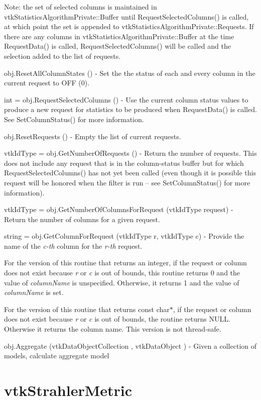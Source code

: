 \begin{DoxyItemize}
Note\-: the set of selected columns is maintained in vtk\-Statistics\-Algorithm\-Private\-::\-Buffer until Request\-Selected\-Columns() is called, at which point the set is appended to vtk\-Statistics\-Algorithm\-Private\-::\-Requests. If there are any columns in vtk\-Statistics\-Algorithm\-Private\-::\-Buffer at the time Request\-Data() is called, Request\-Selected\-Columns() will be called and the selection added to the list of requests.  
\item {\ttfamily obj.\-Reset\-All\-Column\-States ()} -\/ Set the the status of each and every column in the current request to O\-F\-F (0).  
\item {\ttfamily int = obj.\-Request\-Selected\-Columns ()} -\/ Use the current column status values to produce a new request for statistics to be produced when Request\-Data() is called. See Set\-Column\-Status() for more information.  
\item {\ttfamily obj.\-Reset\-Requests ()} -\/ Empty the list of current requests.  
\item {\ttfamily vtk\-Id\-Type = obj.\-Get\-Number\-Of\-Requests ()} -\/ Return the number of requests. This does not include any request that is in the column-\/status buffer but for which Request\-Selected\-Columns() has not yet been called (even though it is possible this request will be honored when the filter is run -- see Set\-Column\-Status() for more information).  
\item {\ttfamily vtk\-Id\-Type = obj.\-Get\-Number\-Of\-Columns\-For\-Request (vtk\-Id\-Type request)} -\/ Return the number of columns for a given request.  
\item {\ttfamily string = obj.\-Get\-Column\-For\-Request (vtk\-Id\-Type r, vtk\-Id\-Type c)} -\/ Provide the name of the {\itshape c-\/th} column for the {\itshape r-\/th} request.

For the version of this routine that returns an integer, if the request or column does not exist because {\itshape r} or {\itshape c} is out of bounds, this routine returns 0 and the value of {\itshape column\-Name} is unspecified. Otherwise, it returns 1 and the value of {\itshape column\-Name} is set.

For the version of this routine that returns const char$\ast$, if the request or column does not exist because {\itshape r} or {\itshape c} is out of bounds, the routine returns N\-U\-L\-L. Otherwise it returns the column name. This version is not thread-\/safe.  
\item {\ttfamily obj.\-Aggregate (vtk\-Data\-Object\-Collection , vtk\-Data\-Object )} -\/ Given a collection of models, calculate aggregate model  
\end{DoxyItemize}\hypertarget{vtkinfovis_vtkstrahlermetric}{}\section{vtk\-Strahler\-Metric}\label{vtkinfovis_vtkstrahlermetric}
